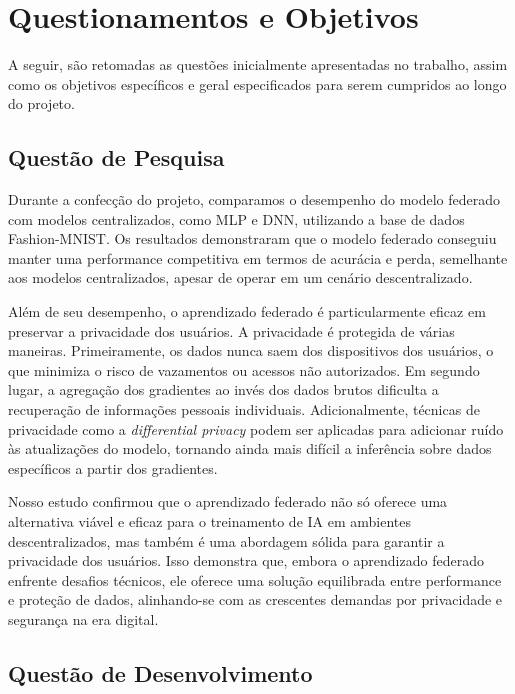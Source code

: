 \section{Questionamentos e Objetivos}
\label{sec:questionamentos}

A seguir, são retomadas as questões inicialmente apresentadas no trabalho, assim como os objetivos específicos e geral especificados para serem cumpridos ao longo do projeto.

\subsection{Questão de Pesquisa}

Durante a confecção do projeto, comparamos o desempenho do modelo federado com modelos centralizados, como MLP e DNN, utilizando a base de dados Fashion-MNIST. Os resultados demonstraram que o modelo federado conseguiu manter uma performance competitiva em termos de acurácia e perda, semelhante aos modelos centralizados, apesar de operar em um cenário descentralizado. 

Além de seu desempenho, o aprendizado federado é particularmente eficaz em preservar a privacidade dos usuários. A privacidade é protegida de várias maneiras. Primeiramente, os dados nunca saem dos dispositivos dos usuários, o que minimiza o risco de vazamentos ou acessos não autorizados. Em segundo lugar, a agregação dos gradientes ao invés dos dados brutos dificulta a recuperação de informações pessoais individuais. Adicionalmente, técnicas de privacidade como a \textit{differential privacy} podem ser aplicadas para adicionar ruído às atualizações do modelo, tornando ainda mais difícil a inferência sobre dados específicos a partir dos gradientes.

Nosso estudo confirmou que o aprendizado federado não só oferece uma alternativa viável e eficaz para o treinamento de IA em ambientes descentralizados, mas também é uma abordagem sólida para garantir a privacidade dos usuários. Isso demonstra que, embora o aprendizado federado enfrente desafios técnicos, ele oferece uma solução equilibrada entre performance e proteção de dados, alinhando-se com as crescentes demandas por privacidade e segurança na era digital.

\subsection{Questão de Desenvolvimento}

